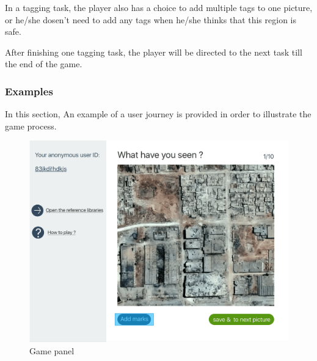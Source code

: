       In a tagging task,
      the player also has a choice to add multiple tags to one picture,
      or he/she dosen't need to add any tags when he/she thinks that this region is safe.

      After finishing one tagging task, 
      the player will be directed to the next task till the end of the game.


      \subsubsection{Examples}
      In this section,
      An example of a user journey is provided in order to illustrate the game process.

      \noindent\begin{minipage}{.45\textwidth}
      \begin{figure}[H]
      \centering
      \includegraphics[width=\textwidth]{figures/function-player-0}
      \caption{Game panel \cite{satellite-photo-1}}
      \label{fig:player0}
      \end{figure}
      \end{minipage}\hfill
